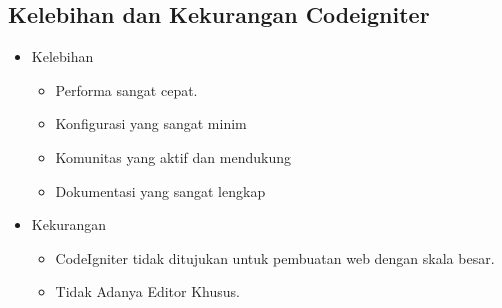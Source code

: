 \subsection{Kelebihan dan Kekurangan Codeigniter}
\begin{itemize}
	\item Kelebihan
\begin{itemize}
	\item Performa sangat cepat.
	\item Konfigurasi yang sangat minim
	\item Komunitas yang aktif dan mendukung
	\item Dokumentasi yang sangat lengkap
\end{itemize}
	\item Kekurangan
\begin{itemize}
	\item CodeIgniter tidak ditujukan untuk pembuatan web dengan skala besar.
	\item Tidak Adanya Editor Khusus.
\end{itemize}
\end{itemize}
